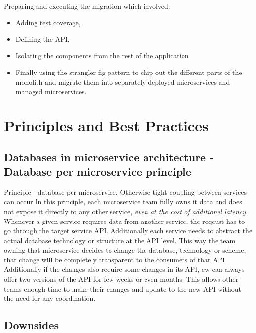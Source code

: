 \documentclass[a4paper, 11pt]{book}
\begin{document}
    \paragraph{}
    Preparing and executing the migration which involved:

    \begin{itemize}
        \item Adding test coverage,
        \item Defining the API,
        \item Isolating the components from the rest of the application
        \item Finally using the strangler fig pattern to chip out the different parts of the monolith and migrate them into separately deployed microservices and managed microservices.
    \end{itemize}


    \section{Principles and Best Practices}

    \subsection{Databases in microservice architecture - Database per microservice principle}
    Principle - database per microservice. Otherwise tight coupling between services can occur
    In this principle, each microservice team fully owns it data and does not expose it directly to any other service, \textit{even at the cost of additional latency}.
    Whenever a given service requires data from another service, the reqeust has to go through the target service API.
    Additionally each service needs to abstract the actual database technology or structure at the API level.
    This way the team owning that microservice decides to change the database, technology or scheme, that change will be completely transparent to the consumers of that API
    Additionally if the changes also require some changes in its API, ew can always offer two versions of the API for few weeks or even months.
    This allows other teams enough time to make their changes and update to the new API without the need for any coordination.

    \subsection{Downsides}
\end{document}
